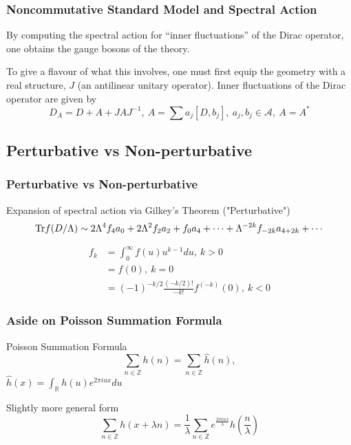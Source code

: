\documentclass{beamer}
\def\Z{{\mathbb Z}}
\def\R{{\mathbb R}}
\def\cA{{\mathcal A}}
\def\Tr{{\rm Tr}}
\begin{document}
\begin{frame}
  \frametitle{Noncommutative Standard Model and Spectral Action}
  \begin{block}{}
    By computing the spectral action for ``inner fluctuations'' of the Dirac operator, one obtains the gauge bosons of the theory.
  \end{block}

  \begin{block}{}
    To give a flavour of what this involves, one must first equip the geometry with a real structure, $J$ (an antilinear unitary operator). Inner fluctuations of the Dirac operator are given by
    \[
    D_A = D + A + J A J^{-1},~ A = \sum a_j [D, b_j],~ a_j, b_j \in \cA,~ A = A^*
    \]
  \end{block}
\end{frame}

\subsection{Perturbative vs Non-perturbative}

\begin{frame}
  \frametitle{Perturbative vs Non-perturbative}
  \begin{block}{Expansion of spectral action via Gilkey's Theorem ("Perturbative")}
    \[
      \Tr f (D/\Lambda) \sim 2 \Lambda^4 f_4 a_0 + 2 \Lambda^2 f_2 a_2 + f_0 a_4 + \cdots + \Lambda^{-2k} f_{-2k} a_{4+2k} + \cdots
    \]

    \begin{align*}
      f_k &= \int_{0}^{\infty} f(u) u^{k-1} du, ~ k>0 \\
      &= f(0), ~ k = 0\\
      &= (-1)^{-k/2} \frac{(-k/2)!}{-k!}f^{(-k)}(0), ~ k < 0
    \end{align*}
  \end{block}
\end{frame}

\begin{frame}
	\frametitle{Aside on Poisson Summation Formula}
	\begin{block}{Poisson Summation Formula}
		\[
			\sum_{n \in \Z} h(n) = \sum_{n\in \Z} \widehat{h}(n),
		\]
		$\widehat{h}(x) = \int_{\R} h(u) e^{2\pi i u x} du$
	\end{block}
	
	\pause
	
	\begin{block}{Slightly more general form}
		\[
		\sum_{n \in \Z} h(x + \lambda n) = \frac{1}{\lambda} \sum_{n \in \Z} e^{\frac{2\pi i n x}{\lambda}}\widehat{h}(\frac{n}{\lambda})
		\]
	\end{block}
	
	
\end{frame}
\end{document}
